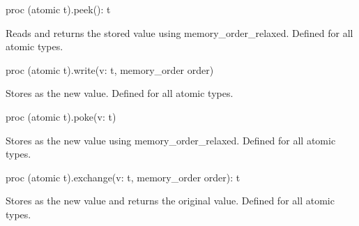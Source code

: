 \begin{protohead}
proc (atomic t).peek(): t
\end{protohead}
\begin{protobody}
Reads and returns the stored value using memory\_order\_relaxed.
Defined for all atomic types.
\end{protobody}

\begin{protohead}
proc (atomic t).write(v: t, memory_order order)
\end{protohead}
\begin{protobody}
Stores  as the new value. Defined for all atomic types.  
\end{protobody}

\begin{protohead}
proc (atomic t).poke(v: t)
\end{protohead}
\begin{protobody}
Stores  as the new value using memory\_order\_relaxed.
Defined for all atomic types.
\end{protobody}

\begin{protohead}
proc (atomic t).exchange(v: t, memory_order order): t
\end{protohead}
\begin{protobody}
Stores  as the new value and returns the original
value. Defined for all atomic types. 
\end{protobody}

